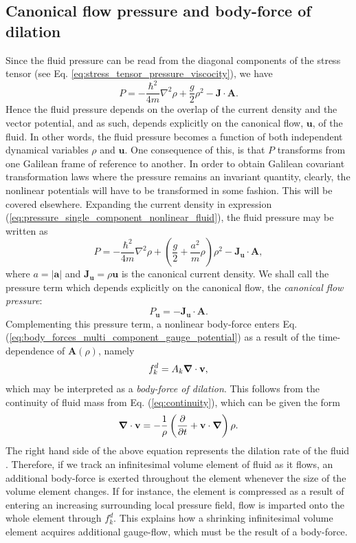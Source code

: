 \documentclass[twocolumn, nofootinbib, nobibnotes, amsmath,amssymb,aps, pra, floatfix]{revtex4-1}
\renewcommand{\v}[1]{\ensuremath{\mathbf{#1}}} %
\newcommand{\gv}[1]{\ensuremath{\mbox{\boldmath$ #1 $}}} %
\newcommand{\abs}[1]{\left| #1 \right|} %
\newcommand{\pd}[2]{\frac{\partial #1}{\partial #2}} %
\newcommand{\grad}[1]{\gv{\nabla} #1} %
\renewcommand{\div}[1]{\gv{\nabla} \cdot #1} %
\begin{document}
\subsection{Canonical flow pressure and body-force of dilation}
Since the fluid pressure can be read from the diagonal components of the stress tensor (see Eq. \ref{eq:stress_tensor_pressure_viscocity}), we have
\begin{equation}
  P=-\frac{\hbar^2}{4m}\nabla^2\rho+\frac{g}{2}\rho^2-\v{J}\cdot\v{A}.
  \label{eq:pressure_single_component_nonlinear_fluid}
\end{equation}
Hence the fluid pressure depends on the overlap of the current density and the vector potential, and as such, depends explicitly on the canonical flow, $\v{u}$, of the fluid.
In other words, the fluid pressure becomes a function of both independent dynamical variables $\rho$ and $\v{u}$.
One consequence of this, is that $P$ transforms from one Galilean frame of reference to another.
In order to obtain Galilean covariant transformation laws where the pressure remains an invariant quantity, clearly, the nonlinear potentials will have to be transformed in some fashion.
This will be covered elsewhere.
Expanding the current density in expression (\ref{eq:pressure_single_component_nonlinear_fluid}), the fluid pressure may be written as
\begin{equation}
	P=-\frac{\hbar^2}{4m}\nabla^2\rho+\left( \frac{g}{2}+\frac{a^2}{m}\rho\right) \rho^2-\v{J}_{\v{u}}\cdot\v{A},
  \label{eq:pressure_single_component_nonlinear_fluid_Expanded}
\end{equation}
where $a=\abs{\v{a}}$ and $\v{J}_{\v{u}}=\rho\v{u}$ is the canonical current density.
We shall call the pressure term which depends explicitly on the canonical flow, the \textit{canonical flow pressure}:
\begin{equation}
  P_{\v{u}}=-\v{J}_{\v{u}}\cdot\v{A}.
  \label{eq:canonicalFlowPressureSingleComponent}
\end{equation}
Complementing this pressure term, a nonlinear body-force enters Eq. (\ref{eq:body_forces_multi_component_gauge_potential}) as a result of the time-dependence of $\v{A}\left( \rho \right)$, namely 
\begin{equation}
  f_k^d=A_k\div{\v{v}},
  \label{eq:boddyForceDilation}
\end{equation}
which may be interpreted as a \textit{body-force of dilation}.
This follows from the continuity of fluid mass from Eq. (\ref{eq:continuity}), which can be given the form
\begin{equation}
  \div{\v{v}}=-\frac{1}{\rho}\left( \pd{}{t}+\v{v}\cdot\grad{} \right)\rho.
  \label{eq:continuity_dilation}
\end{equation}
The right hand side of the above equation represents the dilation rate of the fluid \cite{aris2012vectors}.
Therefore, if we track an infinitesimal volume element of fluid as it flows, an additional body-force is exerted throughout the element whenever the size of the volume element changes.
If for instance, the element is compressed as a result of entering an increasing surrounding local pressure field, flow is imparted onto the whole element through $f_k^d$.
This explains how a shrinking infinitesimal volume element acquires additional gauge-flow, which must be the result of a body-force.
\end{document}
